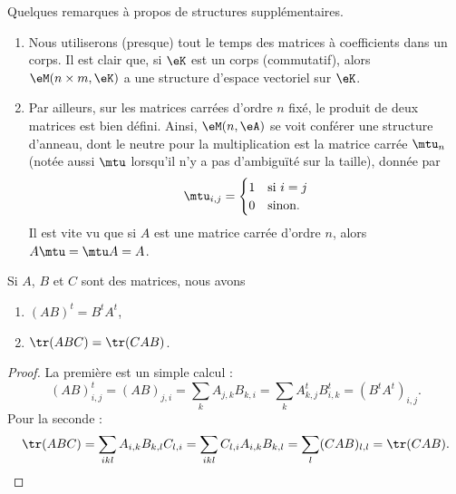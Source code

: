 \begin{remark}
	Quelques remarques à propos de structures supplémentaires.
	\begin{enumerate}
		\item Nous utiliserons (presque) tout le temps des matrices à coefficients dans un corps. Il est clair que, si \( \eK \) est un corps (commutatif), alors \( \eM(n\times m,\eK) \) a une structure d'espace vectoriel sur \( \eK \).
		\item Par ailleurs, sur les matrices carrées d'ordre \( n \) fixé, le produit de deux matrices est bien défini. Ainsi, \( \eM(n,\eA)\) se voit conférer une structure d'anneau, dont le neutre pour la multiplication est la matrice carrée \( \mtu_n\) (notée aussi \( \mtu\) lorsqu'il n'y a pas d'ambiguïté sur la taille), donnée par
		      \begin{equation}
			      \mtu_{i,j}=\begin{cases}
				      1 & \text{si } i=j \\
				      0 & \text{sinon.}
			      \end{cases}
		      \end{equation}
		      Il est vite vu que si \( A\) est une matrice carrée d'ordre \( n \), alors \( A\mtu=\mtu A=A\).
	\end{enumerate}
\end{remark}

\begin{lemma}        \label{LEMooUXDRooWZbMVN}
	Si \( A\), \( B\) et \( C\) sont des matrices, nous avons
	\begin{enumerate}
		\item
		      \( (AB)^t=B^tA^t\),
		\item       \label{ITEMooXDYQooAlnArd}
		      \( \tr(ABC)=\tr(CAB)\).
	\end{enumerate}
\end{lemma}

\begin{proof}
	La première est un simple calcul :
	\begin{equation}
		(AB)^t_{i,j}=(AB)_{j,i}=\sum_kA_{j,k}B_{k,i}=\sum_kA^t_{k,j}B^t_{i,k}=(B^tA^t)_{i,j}.
	\end{equation}
	Pour la seconde :
	\begin{equation}
		\tr(ABC)=\sum_{ikl}A_{i,k}B_{k,l}C_{l,i}=\sum_{ikl}C_{l,i}A_{i,k}B_{k,l}=\sum_l(CAB)_{l,l}=\tr(CAB).
	\end{equation}
\end{proof}

